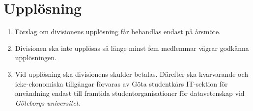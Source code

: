 \documentclass{dvd}
\begin{document}
	\section{Upplösning}

	\begin{enumerate}[label=\arabic* §, ref=\arabic*]

		\item Förslag om divisionens upplösning får behandlas endast på årsmöte.

		\item Divisionen ska inte upplösas så länge minst fem medlemmar vägrar godkänna upplösningen.

		\item Vid upplösning ska divisionens skulder betalas.
		Därefter ska kvarvarande och icke-ekonomiska tillgångar förvaras av Göta studentkårs IT-sektion för användning endast till framtida studentorganisationer för datavetenskap vid \emph{Göteborgs universitet}.

	\end{enumerate}
\end{document}
